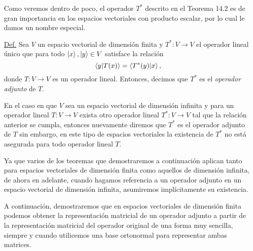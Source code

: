 \documentclass[12pt,libertine]{book}
\begin{document}
Como veremos dentro de poco, el operador $T^*$ descrito en el Teorema 14.2 es de gran importancia en los espacios vectoriales con producto escalar, por lo cual le damos un nombre especial.

\hspace{0.5mm}
\begin{tcolorbox} \label{Def:Operador_adjunto}
\underline{Def.} Sea $V$ un espacio vectorial de dimensión finita y $T^*:V\to V$ el operador lineal único que para todo $\ket{x},\ket{y}\in V$ satisface la relación $$\braket{y|T(x)}=\braket{T^*(y)|x},$$ donde $T:V\to V$ es un operador lineal. Entonces, decimos que $T^*$ es el \emph{operador adjunto} de $T$.

\vspace{5mm}
\hspace{3mm} En el caso en que $V$ sea un espacio vectorial de dimensión infinita y para un operador lineal $T:V\to V$ exista otro operador lineal $T^*:V\to V$ tal que la relación anterior se cumpla, entonces nuevamente diremos que $T^*$ es el operador adjunto de $T$ \textemdash sin embargo, en este tipo de espacios vectoriales la existencia de $T^*$ no está asegurada para todo operador lineal $T$.
\end{tcolorbox}
\vspace{5mm}

Ya que varios de los teoremas que demostraremos a continuación aplican tanto para espacios vectoriales de dimensión finita como aquellos de dimensión infinita, de ahora en adelante, cuando hagamos referencia a un operador adjunto en un espacio vectorial de dimensión infinita, asumiremos implícitamente su existencia.

A continuación, demostraremos que en espacios vectoriales de dimensión finita podemos obtener la representación matricial de un operador adjunto a partir de la representación matricial del operador original de una forma muy sencilla, siempre y cuando utilicemos una base ortonormal para representar ambas matrices.

\end{document}
